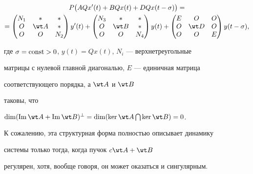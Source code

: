 \begin{multline*}


P\big( AQx'(t)+BQx(t)+DQx(t-\sigma)\big) = \\


%


=


\begin{pmatrix}


 N_1 & * & *\\


 O & \wt A & *\\


 O & O & N_2


\end{pmatrix}y'(t)+


\begin{pmatrix}


 N_3 & * & *\\


 O & \wt B & *\\


 O & O & N_4


\end{pmatrix} y(t)+


\begin{pmatrix}


 E & O & O\\


 O & \wt D & O\\


 O & O & E


\end{pmatrix}y(t-\sigma),


\end{multline*}


где $\sigma=\operatorname{const} >0$, $y(t)=Qx(t)$, $N_i$ --- верхнетреугольные


матрицы с нулевой главной диагональю, $E$ --- единичная матрица 


соответствующего порядка, а $\wt A$ и $\wt B$


таковы, что


$\dim (\im \wt A +\im \wt B)^{\perp}=\dim 


(\ker \wt A \bigcap \ker \wt B)=0$.





К сожалению, эта структурная форма полностью описывает динамику


системы только тогда, когда пучок $c \wt A + \wt B$


регулярен, хотя, вообще говоря, он может оказаться и сингулярным.


